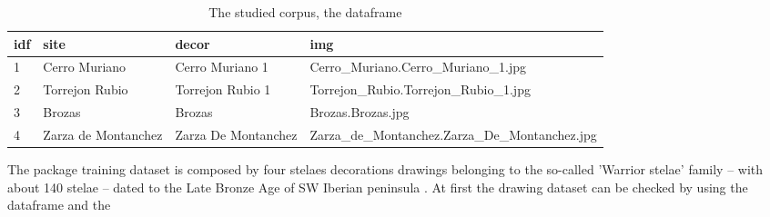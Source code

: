 \documentclass[article]{jss}\usepackage{knitr}
\begin{document}
\begin{table}[H]
\centering
\begin{tabular}{|p{0.5cm}|p{2.5cm}|p{2.5cm}|p{8.5cm}|}
  \hline
idf & site & decor & img \\ 
  \hline
  1 & Cerro Muriano & Cerro Muriano 1 & Cerro\_Muriano.Cerro\_Muriano\_1.jpg \\ 
    2 & Torrejon Rubio & Torrejon Rubio 1 & Torrejon\_Rubio.Torrejon\_Rubio\_1.jpg \\ 
    3 & Brozas & Brozas & Brozas.Brozas.jpg \\ 
    4 & Zarza de Montanchez & Zarza De Montanchez & Zarza\_de\_Montanchez.Zarza\_De\_Montanchez.jpg \\ 
   \hline
\end{tabular}
\caption{The studied corpus, the  dataframe} 
\label{Test_table}
\end{table}


The  package training dataset is composed by four stelaes decorations drawings \citep{DiazGuardamino10} belonging to the so-called 'Warrior stelae' family -- with about 140 stelae -- dated to the Late Bronze Age of SW Iberian peninsula \citep{Celestino01}. At first the drawing dataset can be checked by using the  dataframe and the 
\end{document}
